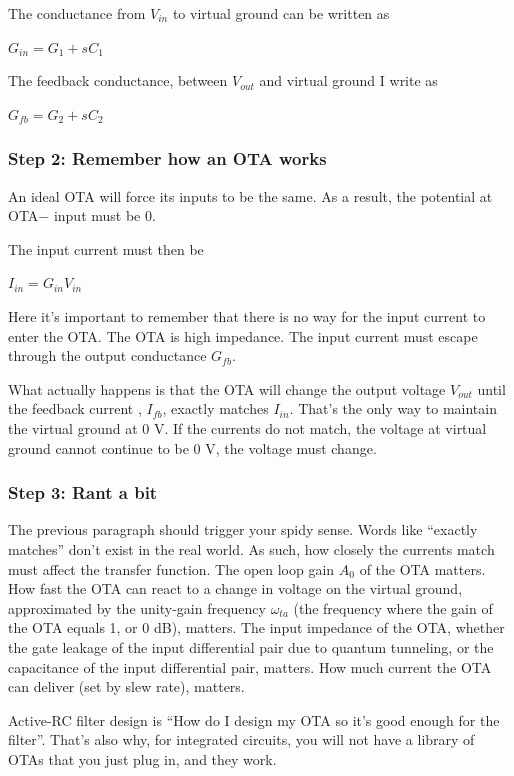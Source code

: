 The conductance from \(V_{in}\) to virtual ground can be written as

\(G_{in} = G_1 + sC_1\)

The feedback conductance, between \(V_{out}\) and virtual ground I write
as

\(G_{fb} = G_2 + sC_2\)

\subsubsection{Step 2: Remember how an OTA
works}\label{step-2-remember-how-an-ota-works}

An ideal OTA will force its inputs to be the same. As a result, the
potential at OTA\(-\) input must be 0.

The input current must then be

\(I_{in} = G_{in} V_{in}\)

Here it's important to remember that there is no way for the input
current to enter the OTA. The OTA is high impedance. The input current
must escape through the output conductance \(G_{fb}\).

What actually happens is that the OTA will change the output voltage
\(V_{out}\) until the feedback current , \(I_{fb}\), exactly matches
\(I_{in}\). That's the only way to maintain the virtual ground at 0 V.
If the currents do not match, the voltage at virtual ground cannot
continue to be 0 V, the voltage must change.

\subsubsection{Step 3: Rant a bit}\label{step-3-rant-a-bit}

The previous paragraph should trigger your spidy sense. Words like
``exactly matches'' don't exist in the real world. As such, how closely
the currents match must affect the transfer function. The open loop gain
\(A_0\) of the OTA matters. How fast the OTA can react to a change in
voltage on the virtual ground, approximated by the unity-gain frequency
\(\omega_{ta}\) (the frequency where the gain of the OTA equals 1, or 0
dB), matters. The input impedance of the OTA, whether the gate leakage
of the input differential pair due to quantum tunneling, or the
capacitance of the input differential pair, matters. How much current
the OTA can deliver (set by slew rate), matters.

Active-RC filter design is ``How do I design my OTA so it's good enough
for the filter''. That's also why, for integrated circuits, you will not
have a library of OTAs that you just plug in, and they work.

